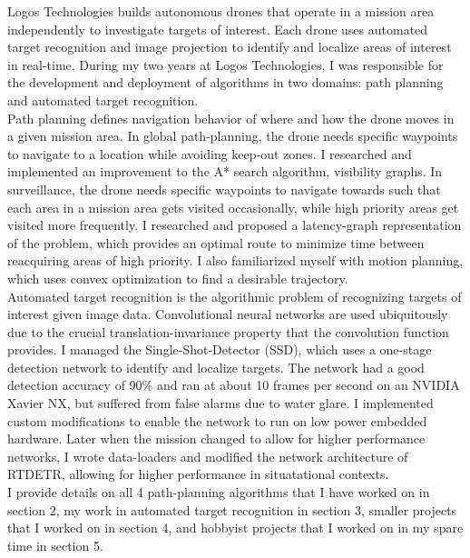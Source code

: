 Logos Technologies builds autonomous drones that operate in a mission area independently to investigate targets of interest. Each drone uses automated target recognition and image projection to identify and localize areas of interest in real-time. During my two years at Logos Technologies, I was responsible for the development and deployment of algorithms in two domains: path planning and automated target recognition.\\

Path planning defines navigation behavior of where and how the drone moves in a given mission area. In global path-planning, the drone needs specific waypoints to navigate to a location while avoiding keep-out zones. I researched and implemented an improvement to the A* search algorithm, visibility graphs. In surveillance, the drone needs specific waypoints to navigate towards such that each area in a mission area gets visited occasionally, while high priority areas get visited more frequently. I researched and proposed a latency-graph representation of the problem, which provides an optimal route to minimize time between reacquiring areas of high priority. I also familiarized myself with motion planning, which uses convex optimization to find a desirable trajectory.\\

Automated target recognition is the algorithmic problem of recognizing targets of interest given image data. Convolutional neural networks are used ubiquitously due to the crucial translation-invariance property that the convolution function provides. I managed the Single-Shot-Detector (SSD), which uses a one-stage detection network to identify and localize targets. The network had a good detection accuracy of 90\% and ran at about 10 frames per second on an NVIDIA Xavier NX, but suffered from false alarms due to water glare. I implemented custom modifications to enable the network to run on low power embedded hardware. Later when the mission changed to allow for higher performance networks, I wrote data-loaders and modified the network architecture of RTDETR, allowing for higher performance in situatational contexts.\\

I provide details on all 4 path-planning algorithms that I have worked on in section 2, my work in automated target recognition in section 3, smaller projects that I worked on in section 4, and hobbyist projects that I worked on in my spare time in section 5. 